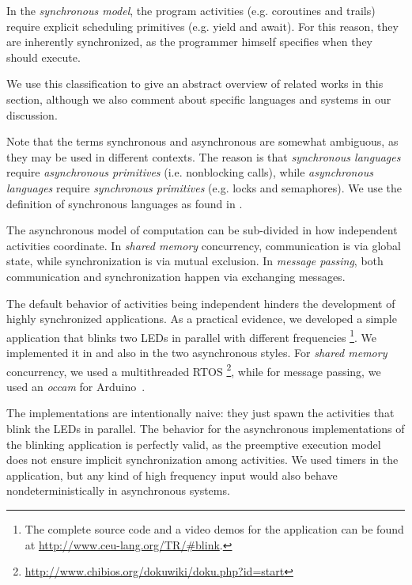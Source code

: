 In the \emph{synchronous model}, the program activities (e.g. coroutines and 
\CEU{} trails) require explicit scheduling primitives (e.g. yield and \CEU{} 
await).
For this reason, they are inherently synchronized, as the programmer himself 
specifies when they should execute.

We use this classification to give an abstract overview of related works in 
this section, although we also comment about specific languages and systems in 
our discussion.

Note that the terms synchronous and asynchronous are somewhat ambiguous, as 
they may be used in different contexts.
The reason is that \emph{synchronous languages} require \emph{asynchronous 
primitives} (i.e. nonblocking calls), while \emph{asynchronous languages} 
require \emph{synchronous primitives} (e.g. locks and semaphores).
We use the definition of synchronous languages as found in 
\cite{rp.twelve,rp.hypothesis}.

The asynchronous model of computation can be sub-divided in how independent 
activities coordinate.
In \emph{shared memory} concurrency, communication is via global state, while 
synchronization is via mutual exclusion.
In \emph{message passing}, both communication and synchronization happen via 
exchanging messages.

The default behavior of activities being independent hinders the development of 
highly synchronized applications.
As a practical evidence, we developed a simple application that blinks two LEDs 
in parallel with different frequencies%
\footnote{The complete source code and a video demos for the application can be 
found at \url{http://www.ceu-lang.org/TR/\#blink}.}.
We implemented it in \CEU{} and also in the two asynchronous styles.
For \emph{shared memory} concurrency, we used a multithreaded RTOS%
\footnote{\url{http://www.chibios.org/dokuwiki/doku.php?id=start}}, while for 
message passing, we used an \emph{occam} for Arduino~\cite{arduino.occam}.

The implementations are intentionally naive: they just spawn the activities 
that blink the LEDs in parallel.
The behavior for the asynchronous implementations of the blinking application 
is perfectly valid, as the preemptive execution model does not ensure implicit 
synchronization among activities.
We used timers in the application, but any kind of high frequency input would 
also behave nondeterministically in asynchronous systems.

